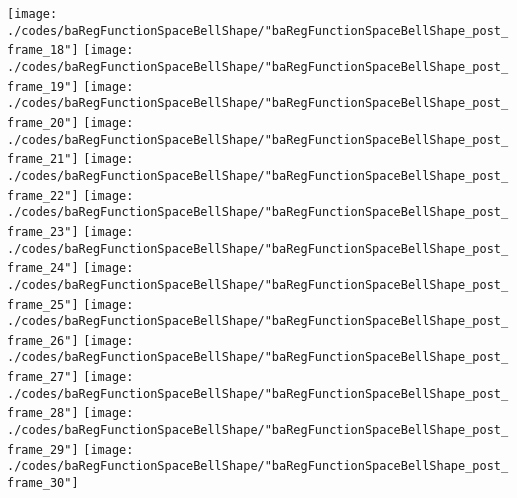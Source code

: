 \begin{frame}{\insertsection}
\begin{center}
{\begin{animateinline}{15}
				 \texttt{[image: ./codes/baRegFunctionSpaceBellShape/"baRegFunctionSpaceBellShape\_post\_frame\_18"]}\newframe
				 \texttt{[image: ./codes/baRegFunctionSpaceBellShape/"baRegFunctionSpaceBellShape\_post\_frame\_19"]}\newframe
				 \texttt{[image: ./codes/baRegFunctionSpaceBellShape/"baRegFunctionSpaceBellShape\_post\_frame\_20"]}\newframe
				 \texttt{[image: ./codes/baRegFunctionSpaceBellShape/"baRegFunctionSpaceBellShape\_post\_frame\_21"]}\newframe
				 \texttt{[image: ./codes/baRegFunctionSpaceBellShape/"baRegFunctionSpaceBellShape\_post\_frame\_22"]}\newframe
				 \texttt{[image: ./codes/baRegFunctionSpaceBellShape/"baRegFunctionSpaceBellShape\_post\_frame\_23"]}\newframe
				 \texttt{[image: ./codes/baRegFunctionSpaceBellShape/"baRegFunctionSpaceBellShape\_post\_frame\_24"]}\newframe
				 \texttt{[image: ./codes/baRegFunctionSpaceBellShape/"baRegFunctionSpaceBellShape\_post\_frame\_25"]}\newframe
				 \texttt{[image: ./codes/baRegFunctionSpaceBellShape/"baRegFunctionSpaceBellShape\_post\_frame\_26"]}\newframe
				 \texttt{[image: ./codes/baRegFunctionSpaceBellShape/"baRegFunctionSpaceBellShape\_post\_frame\_27"]}\newframe
				 \texttt{[image: ./codes/baRegFunctionSpaceBellShape/"baRegFunctionSpaceBellShape\_post\_frame\_28"]}\newframe
				 \texttt{[image: ./codes/baRegFunctionSpaceBellShape/"baRegFunctionSpaceBellShape\_post\_frame\_29"]}\newframe
				 \texttt{[image: ./codes/baRegFunctionSpaceBellShape/"baRegFunctionSpaceBellShape\_post\_frame\_30"]}
			 \end{animateinline}
			}
	\end{center}
    
\end{frame}


